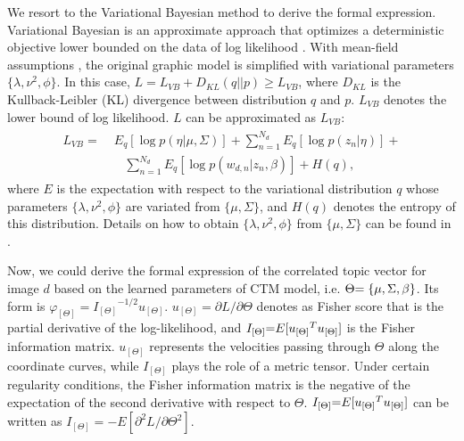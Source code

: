 \documentclass[journal]{IEEEtran}
\begin{document}
We resort to the Variational Bayesian method \cite{jordan1999introduction} to derive the formal expression. Variational Bayesian is an approximate approach that optimizes a deterministic objective lower bounded on the data of log likelihood \cite{jordan1999introduction}. With mean-field assumptions \cite{blei2006correlated}, the original graphic model is simplified with variational parameters $\{ \lambda ,{\nu ^2},\phi \}$. In this case, $L = {L_{VB}} + {D_{KL}(q || p)} \ge {L_{VB}}$, where ${D_{KL}}$ is the Kullback-Leibler (KL) divergence between distribution $q$ and $p$. ${L_{VB}}$ denotes the lower bound of log likelihood. $L$ can be approximated as $L_{VB}$:
\begin{equation} \label{Equ:Lvb}
    \begin{array}{l}
        \begin{aligned}
            L_{VB} = & \;{E_q}[\log p(\eta |\mu ,\Sigma )] + \sum\limits_{n = 1}^{{N_d}} {{E_q}[\log p({z_n}|\eta )]}  + \\
              &\;\;\;\;\sum\limits_{n = 1}^{{N_d}} {{E_q}[\log p({w_{d,n}}|{z_n},\beta )]}  + H(q),
        \end{aligned}
    \end{array}
\end{equation}
where $E$ is the expectation with respect to the variational distribution $q$ whose parameters $\{ \lambda ,{\nu ^2},\phi \}$ are variated from $\{ \mu , \Sigma \}$, and $H(q)$ denotes the entropy of this distribution. Details on how to obtain $\{ \lambda ,{\nu ^2},\phi \}$ from $\{ \mu , \Sigma \}$ can be found in \cite{blei2007correction}.

Now, we could derive the formal expression of the correlated topic vector for image $d$ based on the learned parameters of CTM model, i.e. $\Theta {\rm{ = \{ }}\mu ,\Sigma ,\beta {\rm{\} }}$. Its form is ${\varphi _{[\Theta]}} = {I_{[\Theta ]}}^{ - 1/2}{u_{[\Theta]}}$. ${u_{[\Theta ]}} = {\partial L}/{\partial \Theta }$ denotes as Fisher score that is the partial derivative of the log-likelihood, and ${I_{[\Theta ]}}{\rm{ = }}E[{u_{[\Theta ]}}^T{u_{[\Theta ]}}]$ is the Fisher information matrix. ${u_{[\Theta ]}}$ represents the velocities passing through $\Theta$ along the coordinate curves, while ${I_{[\Theta]}}$ plays the role of a metric tensor. Under certain regularity conditions, the Fisher information matrix is the negative of the expectation of the second derivative with respect to $\Theta$. ${I_{[\Theta ]}}{\rm{ = }}E[{u_{[\Theta ]}}^T{u_{[\Theta ]}}]$ can be written as ${I_{[\Theta ]}} =  - E[ {{\partial ^2}L}/{\partial {\Theta ^2}}]$.
\end{document}
